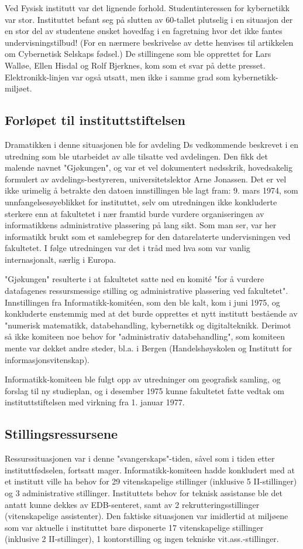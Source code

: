 \documentclass[../main.tex]{subfiles}
\begin{document}
Ved Fysisk institutt var det lignende forhold. Studentinteressen for kybernetikk var stor. Instituttet befant seg på slutten av 60-tallet plutselig i en situasjon der en stor del av studentene ønsket hovedfag i en fagretning hvor det ikke fantes undervisningstilbud! (For en nærmere beskrivelse av dette henvises til artikkelen om Cybernetisk Selskaps fødsel.) De stillingene som ble opprettet for Lars Walløe, Ellen Hisdal og Rolf Bjerknes, kom som et svar på dette presset. Elektronikk-linjen var også utsatt, men ikke i samme grad som kybernetikk-miljøet.

\subsection{Forløpet til instituttstiftelsen}
Dramatikken i denne situasjonen ble for avdeling Ds vedkommende beskrevet i en utredning som ble utarbeidet av alle tilsatte ved avdelingen. Den fikk det malende navnet "Gjøkungen", og var et vel dokumentert nødsskrik, hovedsakelig formulert av avdelings-bestyreren, universitetslektor Arne Jonassen. Det er vel ikke urimelig å betrakte den datoen innstillingen ble lagt fram: 9. mars 1974, som unnfangelsesøyeblikket for instituttet, selv om utredningen ikke konkluderte sterkere enn at fakultetet i nær framtid burde vurdere organiseringen av informatikkens administrative plassering på lang sikt. Som man ser, var her informatikk brukt som et samlebegrep for den datarelaterte undervisningen ved fakultetet. I følge utredningen var det i tråd med hva som var vanlig internasjonalt, særlig i Europa.

"Gjøkungen" resulterte i at fakultetet satte ned en komité "for å vurdere datafagenes ressursmessige stilling og administrative plassering ved fakultetet". Innstillingen fra Informatikk-komitéen, som den ble kalt, kom i juni 1975, og konkluderte enstemmig med at det burde opprettes et nytt institutt bestående av "numerisk matematikk, databehandling, kybernetikk og digitalteknikk. Derimot så ikke komiteen noe behov for "administrativ databehandling", som komiteen mente var dekket andre steder, bl.a. i Bergen (Handelshøyskolen og Institutt for informasjonsvitenskap).

Informatikk-komiteen ble fulgt opp av utredninger om geografisk samling, og forslag til ny studieplan, og i desember 1975 kunne fakultetet fatte vedtak om instituttstiftelsen med virkning fra 1. januar 1977.

\subsection{Stillingsressursene}
Ressurssituasjonen var i denne "svangerskaps"-tiden, såvel som i tiden etter instituttfødselen, fortsatt mager. Informatikk-komiteen hadde konkludert med at et institutt ville ha behov for 29 vitenskapelige stillinger (inklusive 5 II-stillinger) og 3 administrative stillinger. Instituttets behov for teknisk assistanse ble det antatt kunne dekkes av EDB-senteret, samt av 2 rekrutteringsstillinger (vitenskapelige assistenter). Den faktiske situasjonen var imidlertid at miljøene som var aktuelle i instituttet bare disponerte 17 vitenskapelige stillinger (inklusive 2 II-stillinger), 1 kontorstilling og ingen tekniske vit.ass.-stillinger.
\end{document}
